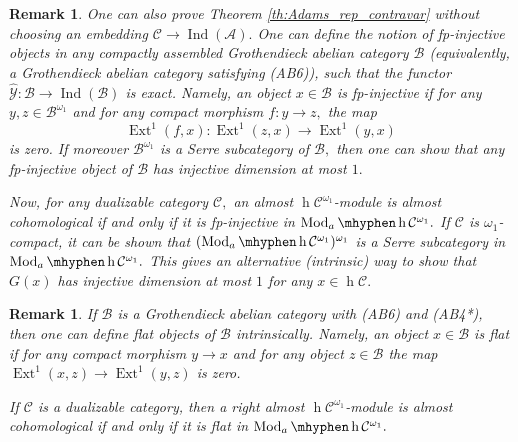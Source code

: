 \documentclass[11pt,leqno]{amsart}
\newtheorem{remark}[theo]{Remark}
\numberwithin{equation}{section}
\def\h{\operatorname{h}}
\newcommand{\hy}{\mhyphen}
\newcommand{\indlim}[1][]{\mathop{\varinjlim}\limits_{#1}}
\newcommand{\cont}{\operatorname{cont}}
\newcommand{\cA}{{\mathcal A}}
\newcommand{\cB}{{\mathcal B}}
\newcommand{\cC}{{\mathcal C}}
\newcommand{\cY}{{\mathcal Y}}
\newcommand{\Fun}{\operatorname{Fun}}
\newcommand{\im}{\operatorname{Im}}
\newcommand{\Ext}{\operatorname{Ext}}
\newcommand{\Ind}{\operatorname{Ind}}
\newcommand{\Alg}{\operatorname{Alg}}
\newcommand{\Mod}{\operatorname{Mod}}
\begin{document}
\begin{remark}One can also prove Theorem \ref{th:Adams_rep_contravar} without choosing an embedding $\cC\to\Ind(\cA).$ One can define the notion of fp-injective objects in any compactly assembled Grothendieck abelian category $\cB$ (equivalently, a Grothendieck abelian category satisfying (AB6)), such that the functor $\hat{\cY}:\cB\to\Ind(\cB)$ is exact. Namely, an object $x\in\cB$ is fp-injective if for any $y,z\in\cB^{\omega_1}$ and for any compact morphism $f:y\to z,$ the map $$\Ext^1(f,x):\Ext^1(z,x)\to\Ext^1(y,x)$$
is zero. If moreover $\cB^{\omega_1}$ is a Serre subcategory of $\cB,$ then one can show that any fp-injective object of $\cB$ has injective dimension at most $1.$

Now, for any dualizable category $\cC,$ an almost $\h\cC^{\omega_1}$-module is almost cohomological if and only if it is fp-injective in $\Mod_a\hy \h\cC^{\omega_1}.$ If $\cC$ is $\omega_1$-compact, it can be shown that $(\Mod_a\hy \h\cC^{\omega_1})^{\omega_1}$ is a Serre subcategory in $\Mod_a\hy \h\cC^{\omega_1}.$ This gives an alternative (intrinsic) way to show that $G(x)$ has injective dimension at most $1$ for any $x\in \h\cC.$\end{remark}

\begin{remark}If $\cB$ is a Grothendieck abelian category with (AB6) and (AB4*), then one can define flat objects of $\cB$ intrinsically. Namely, an object $x\in\cB$ is flat if for any compact morphism $y\to x$ and for any object $z\in\cB$ the map $\Ext^1(x,z)\to \Ext^1(y,z)$ is zero.

If $\cC$ is a dualizable category, then a right almost $\h \cC^{\omega_1}$-module is almost cohomological if and only if it is flat in $\Mod_a\hy\h\cC^{\omega_1}.$\end{remark}


\end{document}

